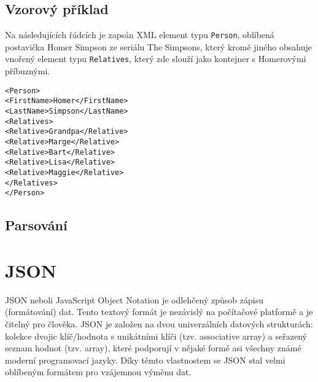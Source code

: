 \subsection{Vzorový příklad}
\label{xmlpriklad}
Na následujících řádcích je zapsán XML element typu \texttt{Person}, oblíbená postavička Homer Simpson ze seriálu The Simpsons, který kromě jiného obsahuje vnořený element typu \texttt{Relatives}, který zde slouží jako kontejner s Homerovými příbuznými.

\texttt{\small<Person>\\
\hspace*{2mm}<FirstName>Homer</FirstName>\\
\hspace*{2mm}<LastName>Simpson</LastName>\\
\hspace*{2mm}<Relatives>\\
\hspace*{4mm}<Relative>Grandpa</Relative>\\
\hspace*{4mm}<Relative>Marge</Relative>\\
\hspace*{4mm}<Relative>Bart</Relative>\\
\hspace*{4mm}<Relative>Lisa</Relative>\\
\hspace*{4mm}<Relative>Maggie</Relative>\\
\hspace*{2mm}</Relatives>\\
</Person>}


\subsection{Parsování}


\section{JSON}
JSON neboli JavaScript Object Notation je odlehčený způsob zápisu (formátování) dat. Tento textový formát je nezávislý na počítačové platformě a je čitelný pro člověka. JSON je založen na dvou univerzálních datových strukturách: kolekce dvojic klíč/hodnota s unikátními klíči (tzv. associative array) a seřazený seznam hodnot (tzv. array), které podporují v nějaké formě asi všechny známé moderní programovací jazyky. Díky těmto vlastnostem se JSON stal velmi oblíbeným formátem pro vzájemnou výměnu dat.

